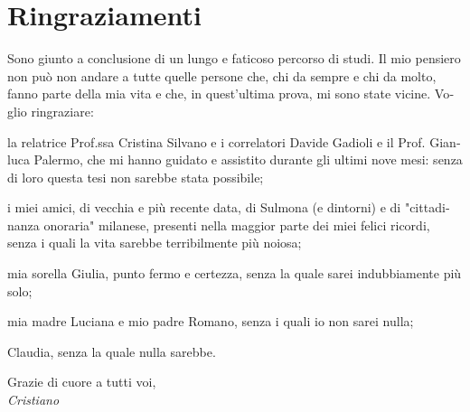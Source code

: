 \chapter*{Ringraziamenti}

\begin{otherlanguage}{italian}





Sono giunto a conclusione di un lungo e faticoso percorso di studi. Il mio pensiero non può non andare a tutte quelle persone che, chi da sempre e chi da molto, fanno parte della mia vita e che, in quest'ultima prova, mi sono state vicine. Voglio ringraziare:


\par\bigskip


la relatrice Prof.ssa Cristina Silvano e i correlatori Davide Gadioli e il Prof. Gianluca Palermo, che mi hanno guidato e assistito durante gli ultimi nove mesi: senza di loro questa tesi non sarebbe stata possibile;


\par\bigskip


i miei amici, di vecchia e più recente data, di Sulmona (e dintorni) e di "cittadinanza onoraria" milanese, presenti nella maggior parte dei miei felici ricordi, senza i quali la vita sarebbe terribilmente più noiosa;


\par\bigskip


mia sorella Giulia, punto fermo e certezza, senza la quale sarei indubbiamente più solo;


\par\bigskip


mia madre Luciana e mio padre Romano, senza i quali io non sarei nulla;


\par\bigskip


Claudia, senza la quale nulla sarebbe.


\par\bigskip


\begin{flushright}

	Grazie di cuore a tutti voi,\\\textit{Cristiano}

\end{flushright}





\end{otherlanguage}
